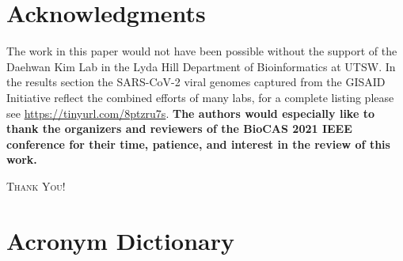 \documentclass[10pt,conference]{IEEEtran}
\begin{document}
\appendices
{\small
\section*{Acknowledgments}
\noindent The work in this paper would not have been possible without the support of the Daehwan Kim Lab in 
the Lyda Hill Department of Bioinformatics at UTSW.  In the results section the SARS-CoV-2 viral 
genomes captured from the GISAID Initiative \cite{gisaid} reflect the combined efforts of many labs, 
for a complete listing please see \url{https://tinyurl.com/8ptzru7s}.  \textbf{The authors would especially like to thank the organizers and reviewers of the BioCAS 2021 IEEE conference for their time, patience, and interest in the review of this work.}
\vspace{-1.5 em}
\begin{center}
\textsc{Thank You!}
\end{center}
\vspace{-1 em}




\vspace{-0.5 em}
\section{Acronym Dictionary} 
\vspace{-0.5 em}

}
\end{document}
